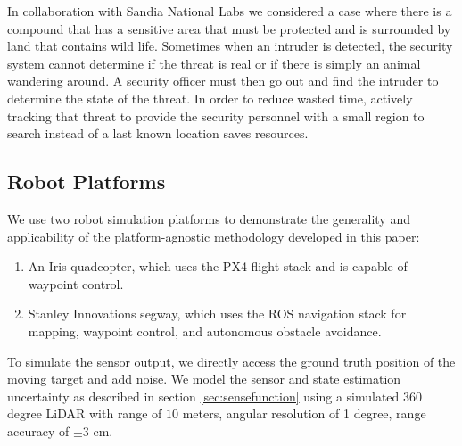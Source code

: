 



In collaboration with Sandia National Labs we considered a case where there is a compound that has a sensitive area that must be protected and is surrounded by land that contains wild life. Sometimes when an intruder is detected, the security system cannot determine if the threat is real or if there is simply an animal wandering around. A security officer must then go out and find the intruder to determine the state of the threat. In order to reduce wasted time, actively tracking that threat to provide the security personnel with a small region to search instead of a last known location saves resources. 






\subsection{Robot Platforms}

We use two robot simulation platforms to demonstrate the generality and applicability of the platform-agnostic methodology developed in this paper:
\begin{enumerate}
    \item An Iris quadcopter, which uses the PX4 flight stack and is capable of waypoint control.
    \item Stanley Innovations segway, which uses the ROS navigation stack for mapping, waypoint control, and autonomous obstacle avoidance. 
\end{enumerate}
To simulate the sensor output, we directly access the ground truth position of the moving target and add noise. We model the sensor and state estimation uncertainty as described in section \ref{sec:sensefunction} using a simulated 360 degree LiDAR with range of  $10$ meters, angular resolution of 1 degree, range accuracy of $\pm 3$ cm.


